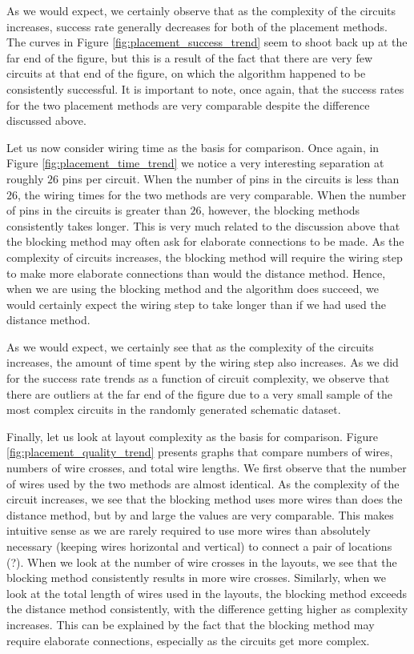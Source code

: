 As we would expect, we certainly observe that as the complexity of the circuits
increases, success rate generally decreases for both of the placement methods.
The curves in Figure \ref{fig:placement_success_trend} seem to shoot back up
at the far end of the figure, but this is a result of the fact that there are
very few circuits at that end of the figure, on which the algorithm happened to
be consistently successful. It is important to note, once again, that the success
rates for the two placement methods are very comparable despite the difference
discussed above.

Let us now consider wiring time as the basis for comparison. Once again, in
Figure \ref{fig:placement_time_trend} we notice a very interesting separation
at roughly $26$ pins per circuit. When the number of pins in the circuits is
less than $26$, the wiring times for the two methods are very comparable.
When the number of pins in the circuits is greater than $26$, however, the
blocking methods consistently takes longer. This is very much related to the
discussion above that the blocking method may often ask for elaborate connections
to be made. As the complexity of circuits increases, the blocking method will
require the wiring step to make more elaborate connections than would the distance
method. Hence, when we are using the blocking method and the algorithm does succeed,
we would certainly expect the wiring step to take longer than if we had used the
distance method.

As we would expect, we certainly see that as the complexity of the circuits
increases, the amount of time spent by the wiring step also increases. As we did
for the success rate trends as a function of circuit complexity, we observe that
there are outliers at the far end of the figure due to a very small sample of the
most complex circuits in the randomly generated schematic dataset.

Finally, let us look at layout complexity as the basis for comparison. Figure
\ref{fig:placement_quality_trend} presents graphs that compare numbers of wires,
numbers of wire crosses, and total wire lengths. We first observe that the
number of wires used by the two methods are almost identical. As the complexity
of the circuit increases, we see that the blocking method uses more wires than
does the distance method, but by and large the values are very comparable. This
makes intuitive sense as we are rarely required to use more wires than
absolutely necessary (keeping wires horizontal and vertical) to connect a pair
of locations (?). When we look at the number of wire crosses in the layouts, we
see that the blocking method consistently results in more wire crosses. Similarly,
when we look at the total length of wires used in the layouts, the blocking
method exceeds the distance method consistently, with the difference getting
higher as complexity increases. This can be explained by the fact that the
blocking method may require elaborate connections, especially as the circuits
get more complex.

